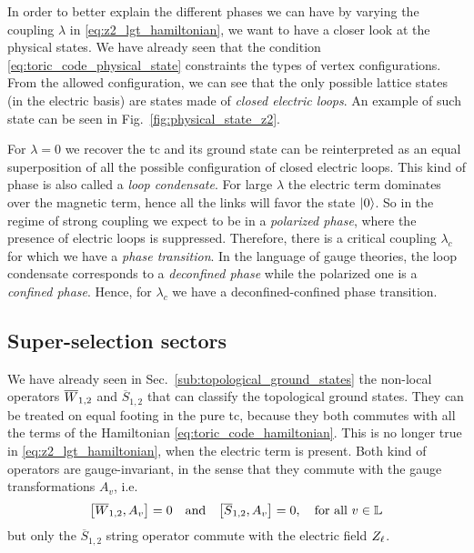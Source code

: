 In order to better explain the different phases we can have by varying the coupling $\lambda$ in \eqref{eq:z2_lgt_hamiltonian}, we want to have a closer look at the physical states.
We have already seen that the condition \eqref{eq:toric_code_physical_state} constraints the types of vertex configurations.
From the allowed configuration, we can see that the only possible lattice states (in the electric basis) are states made of \emph{closed electric loops}.
An example of such state can be seen in Fig.~\ref{fig:physical_state_z2}.


For $\lambda = 0$ we recover the \ac{tc} and its ground state can be reinterpreted as an equal superposition of all the possible configuration of closed electric loops.
This kind of phase is also called a \emph{loop condensate}.
For large $\lambda$ the electric term dominates over the magnetic term, hence all the links will favor the state $\ket{0}$.
So in the regime of strong coupling we expect to be in a \emph{polarized phase}, where the presence of electric loops is suppressed.
Therefore, there is a critical coupling $\lambda_c$ for which we have a \emph{phase transition}.
In the language of gauge theories, the loop condensate corresponds to a \emph{deconfined phase} while the polarized one is a \emph{confined phase}.
Hence, for $\lambda_c$ we have a deconfined-confined phase transition.

\begin{figure}[t]
\end{figure}



\subsection{Super-selection sectors}
\label{sub:super_selection_sectors}

We have already seen in Sec.~\ref{sub:topological_ground_states} the non-local operators $\overline{W}_{1,2}$ and $\overline{S}_{1,2}$ that can classify the topological ground states.
They can be treated on equal footing in the pure \ac{tc}, because they both commutes with all the terms of the Hamiltonian \eqref{eq:toric_code_hamiltonian}.
This is no longer true in \eqref{eq:z2_lgt_hamiltonian}, when the electric term is present.
Both kind of operators are gauge-invariant, in the sense that they commute with the gauge transformations $A_v$, i.e.
\begin{equation}
    \comm{\Wilson_{1,2}}{A_v} = 0
    \qand
    \comm{\overline{S}_{1,2}}{A_v} = 0,
    \quad \text{for all $v \in \Lattice$}
\end{equation}
but only the $\overline{S}_{1,2}$ string operator commute with the electric field $Z_{\ell}$.

